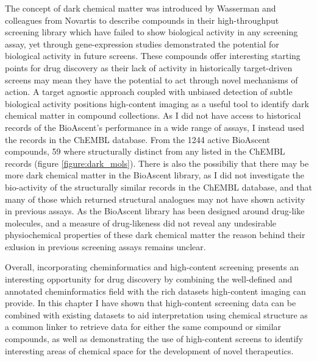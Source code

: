 \documentclass[a4paper,11pt,twoside,openright]{scrbook}
\begin{document}
The concept of dark chemical matter was introduced by Wasserman and colleagues from Novartis to describe compounds in their high-throughput screening library which have failed to show biological activity in any screening assay, yet through gene-expression studies demonstrated the potential for biological activity in future screens. \cite{Wassermann2015}
These compounds offer interesting starting points for drug discovery as their lack of activity in historically target-driven screens may mean they have the potential to act through novel mechanisms of action.
A target agnostic approach coupled with unbiased detection of subtle biological activity positions high-content imaging as a useful tool to identify dark chemical matter in compound collections.
As I did not have access to historical records of the BioAscent's performance in a wide range of assays, I instead used the records in the ChEMBL database.
From the 1244 active BioAscent compounds, 59 where structurally distinct from any listed in the ChEMBL records (figure \ref{figure:dark_mols}).
There is also the possibiliy that there may be more dark chemical matter in the BioAscent library, as I did not investigate the bio-activity of the structurally similar records in the ChEMBL database, and that many of those which returned structural analogues may not have shown activity in previous assays.
As the BioAscent library has been designed around drug-like molecules, and a measure of drug-likeness did not reveal any undesirable physiochemical properties of these dark chemical matter the reason behind their exlusion in previous screening assays remains unclear.


Overall, incorporating cheminformatics and high-content screening presents an interesting opportunity for drug discovery by combining the well-defined and annotated cheminformatics field with the rich datasets high-content imaging can provide.
In this chapter I have shown that high-content screening data can be combined with existing datasets to aid interpretation using chemical structure as a common linker to retrieve data for either the same compound or similar compounds, as well as demonstrating the use of high-content screens to identify interesting areas of chemical space for the development of novel therapeutics.







\end{document}

